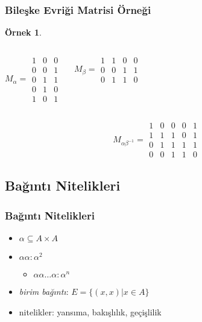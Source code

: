 \documentclass[dvipsnames]{beamer}
\theoremstyle{definition}
\theoremstyle{example}
\newtheorem{ornek}[theorem]{Örnek}
\theoremstyle{plain}
\begin{document}
\begin{frame}
  \frametitle{Bileşke Evriği Matrisi Örneği}

  \begin{ornek}
    \begin{columns}
      \[ M_\alpha =
        \begin{array}{|ccc|}
          1 & 0 & 0\\
          0 & 0 & 1\\
          0 & 1 & 1\\
          0 & 1 & 0\\
          1 & 0 & 1
        \end{array}
      \]

      \[ M_\beta =
        \begin{array}{|cccc|}
          1 & 1 & 0 & 0\\
          0 & 0 & 1 & 1\\
          0 & 1 & 1 & 0
        \end{array}
      \]
    \end{columns}

    \[ M_{\alpha \beta^{-1}} =
      \begin{array}{|ccccc|}
        1 & 0 & 0 & 0 & 1\\
        1 & 1 & 1 & 0 & 1\\
        0 & 1 & 1 & 1 & 1\\
        0 & 0 & 1 & 1 & 0
      \end{array}
    \]
  \end{ornek}
\end{frame}

\subsection{Bağıntı Nitelikleri}

\begin{frame}
  \frametitle{Bağıntı Nitelikleri}

  \begin{itemize}
    \item $\alpha \subseteq A \times A$

    \pause
    \medskip
    \item $\alpha \alpha: \alpha^2$
    \begin{itemize}
      \item $\alpha \alpha \dots \alpha: \alpha^n$
    \end{itemize}

    \pause
    \medskip
    \item \emph{birim bağıntı}: $E = \{(x,x) | x \in A\}$

    \pause
    \medskip
    \item nitelikler: yansıma, bakışlılık, geçişlilik
  \end{itemize}
\end{frame}
\end{document}
